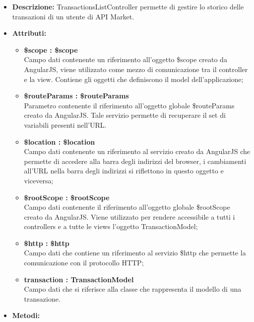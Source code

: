 \begin{itemize}
	\item \textbf{Descrizione:} TransactionsListController permette di gestire lo storico delle transazioni
di un utente di API Market.
	\item \textbf{Attributi:}
		\begin{itemize}
		
			\item \textbf{\$scope : \$scope}\\
			Campo dati contenente un riferimento all'oggetto \$scope creato da AngularJS, viene utilizzato come mezzo di comunicazione tra il controller e la view. Contiene gli oggetti che definiscono il model dell'applicazione;

			\item \textbf{\$routeParams : \$routeParams}\\
			Parametro contenente il riferimento all'oggetto globale \$routeParams creato da AngularJS. Tale servizio permette di recuperare il set di variabili presenti nell'URL.			
			
			\item \textbf{\$location : \$location}\\
			Campo dati contenente un riferimento al servizio creato da AngularJS che permette di accedere alla barra degli indirizzi del browser, i cambiamenti all'URL nella barra degli indirizzi si riflettono in questo oggetto e viceversa;
			
			\item \textbf{\$rootScope : \$rootScope}\\
			Campo dati contenente il riferimento all'oggetto globale \$rootScope creato da AngularJS. Viene utilizzato per rendere accessibile a tutti i controllers e a tutte le views l'oggetto TransactionModel;

			\item \textbf{\$http : \$http }\\
			Campo dati che contiene un riferimento al servizio \$http che permette la comunicazione con il protocollo HTTP;
				
			\item \textbf{transaction : TransactionModel }\\
			Campo dati che si riferisce alla classe che rappresenta il modello di una transazione.
				
		\end{itemize}
	\item \textbf{Metodi:}
		\begin{itemize}
		

\end{itemize}
\end{itemize}
